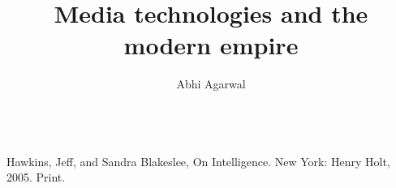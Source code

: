 \documentclass[12pt, oneside]{article}
\title{Media technologies and the modern empire\vspace{-0.4cm}}
\author{Abhi Agarwal\vspace{-1cm}}
\date{}
\begin{document}
\maketitle

\par 

\noindent

\begin{workscited}
\bibent \\
\bibent Hawkins, Jeff, and Sandra Blakeslee, On Intelligence. New York: Henry Holt, 2005. Print. \\
\end{workscited}
\end{document}
